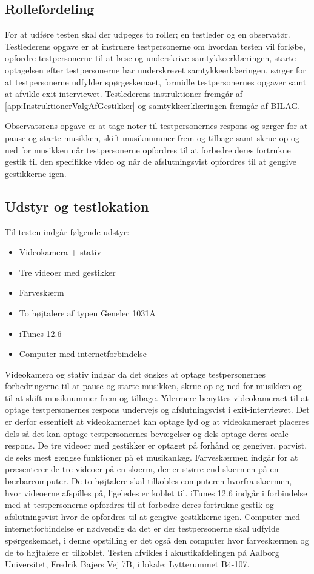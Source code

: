 \subsection{Rollefordeling}
\label{RollerfordelingValgAfGestikker}
%
For at udføre testen skal der udpeges to roller; en testleder og en observatør. Testlederens opgave er at instruere testpersonerne om hvordan testen vil forløbe, opfordre testpersonerne til at læse og underskrive samtykkeerklæringen, starte optagelsen efter testpersonerne har underskrevet samtykkeerklæringen, sørger for at testpersonerne udfylder spørgeskemaet, formidle testpersonernes opgaver samt at afvikle exit-interviewet. Testlederens instruktioner fremgår af \autoref{app:InstruktionerValgAfGestikker} og samtykkeerklæringen fremgår af BILAG. 

Observatørens opgave er at tage noter til testpersonernes respons og sørger for at pause og starte musikken, skift musiknummer frem og tilbage samt skrue op og ned for musikken når testpersonerne opfordres til at forbedre deres fortrukne gestik til den specifikke video og når de afslutningsvist opfordres til at gengive gestikkerne igen. 

\subsection{Udstyr og testlokation}
\label{UdstyrOgTestlokationValgAfGestikker}
%
Til testen indgår følgende udstyr:
%
\begin{itemize}
  \item Videokamera + stativ
  \item Tre videoer med gestikker
  \item Farveskærm 
  \item To højtalere af typen Genelec 1031A
  \item iTunes 12.6  
  \item Computer med internetforbindelse\blankline
\end{itemize}
% 
Videokamera og stativ indgår da det ønskes at optage testpersonernes forbedringerne til at pause og starte musikken, skrue op og ned for musikken og til at skift musiknummer frem og tilbage. Ydermere benyttes videokameraet til at optage testpersonernes respons undervejs og afslutningsvist i exit-interviewet. Det er derfor essentielt at videokameraet kan optage lyd og at videokameraet placeres dels så det kan optage testpersonernes bevægelser og dels optage deres orale respons. De tre videoer med gestikker er optaget på forhånd og gengiver, parvist, de seks mest gængse funktioner på et musikanlæg. Farveskærmen indgår for at præsenterer de tre videoer på en skærm, der er større end skærmen på en bærbarcomputer. De to højtalere skal tilkobles computeren hvorfra skærmen, hvor videoerne afspilles på, ligeledes er koblet til. iTunes 12.6 indgår i forbindelse med at testpersonerne opfordres til at forbedre deres fortrukne gestik og afslutningsvist hvor de opfordres til at gengive gestikkerne igen. Computer med internetforbindelse er nødvendig da det er der testpersonerne skal udfylde spørgeskemaet, i denne opstilling er det også den computer hvor farveskærmen og de to højtalere er tilkoblet.\blankline
% 
Testen afvikles i akustikafdelingen på Aalborg Universitet, Fredrik Bajers Vej 7B, i lokale: Lytterummet B4-107. 
%